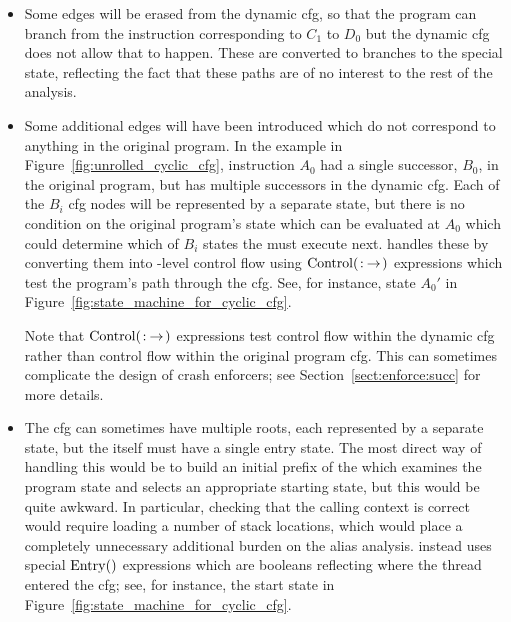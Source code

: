 \begin{itemize}
\item
  Some edges will be erased from the dynamic \gls{cfg}, so that the
  program can branch from the instruction corresponding to $C_1$ to
  $D_0$ but the dynamic \gls{cfg} does not allow that to happen.
  These are converted to branches to the special {\stUnreached} state,
  reflecting the fact that these paths are of no interest to the rest
  of the analysis.

\item
  Some additional edges will have been introduced which do not
  correspond to anything in the original program.  In the example in
  Figure~\ref{fig:unrolled_cyclic_cfg}, instruction $A_0$ had a single
  successor, $B_0$, in the original program, but has multiple
  successors in the dynamic \gls{cfg}.  Each of the $B_i$ \gls{cfg}
  nodes will be represented by a separate {\StateMachine} state, but
  there is no condition on the original program's state which can be
  evaluated at $A_0$ which could determine which of $B_i$ states the
  {\StateMachine} must execute next.  {\Technique} handles these by
  converting them into \StateMachine-level control flow using
  $\mathrm{Control}(\mathrm{}\!:\!\mathrm{}\!\rightarrow\!\mathrm{})$
  expressions which test the program's path through the \gls{cfg}.
  See, for instance, state $A_0'$ in
  Figure~\ref{fig:state_machine_for_cyclic_cfg}.

  Note that $\mathrm{Control}(\mathrm{}\!:\!\mathrm{}\!\rightarrow\!\mathrm{})$ expressions test control flow within
  the dynamic \gls{cfg} rather than control flow within the original
  program \gls{cfg}.  This can sometimes complicate the design of
  crash enforcers; see Section~\ref{sect:enforce:succ} for more
  details.

\item
  The \gls{cfg} can sometimes have multiple roots, each
  represented by a separate {\StateMachine} state, but the
  {\StateMachine} itself must have a single entry state.  The most
  direct way of handling this would be to build an initial prefix of
  the {\StateMachine} which examines the program state and selects an
  appropriate starting state, but this would be quite awkward.  In
  particular, checking that the calling context is correct would
  require loading a number of stack locations, which would place a
  completely unnecessary additional burden on the alias analysis.
  {\Technique} instead uses special $\mathrm{Entry}()$ expressions which
  are booleans reflecting where the thread entered the \gls{cfg}; see, for
  instance, the start state in
  Figure~\ref{fig:state_machine_for_cyclic_cfg}.

\end{itemize}

